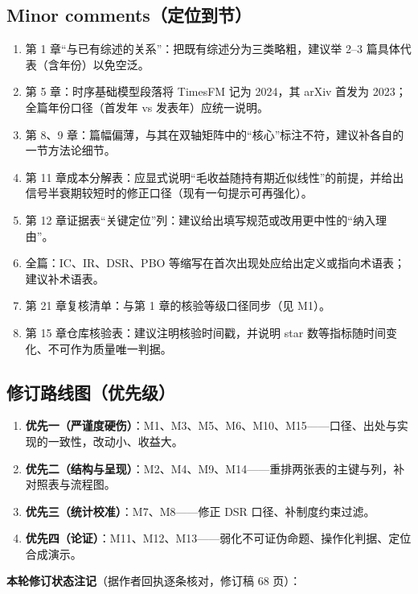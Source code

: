 \documentclass[11pt,a4paper]{ctexart}
\begin{document}
\subsection{Minor comments（定位到节）}

\begin{enumerate}
  \item 第 1 章“与已有综述的关系”：把既有综述分为三类略粗，建议举 2--3 篇具体代表（含年份）以免空泛。
  \item 第 5 章：时序基础模型段落将 TimesFM 记为 2024，其 arXiv 首发为 2023；全篇年份口径（首发年 vs 发表年）应统一说明。
  \item 第 8、9 章：篇幅偏薄，与其在双轴矩阵中的“核心”标注不符，建议补各自的一节方法论细节。
  \item 第 11 章成本分解表：应显式说明“毛收益随持有期近似线性”的前提，并给出信号半衰期较短时的修正口径（现有一句提示可再强化）。
  \item 第 12 章证据表“关键定位”列：建议给出填写规范或改用更中性的“纳入理由”。
  \item 全篇：IC、IR、DSR、PBO 等缩写在首次出现处应给出定义或指向术语表；建议补术语表。
  \item 第 21 章复核清单：与第 1 章的核验等级口径同步（见 M1）。
  \item 第 15 章仓库核验表：建议注明核验时间戳，并说明 star 数等指标随时间变化、不可作为质量唯一判据。
\end{enumerate}

\subsection{修订路线图（优先级）}

\begin{enumerate}
  \item \textbf{优先一（严谨度硬伤）}：M1、M3、M5、M6、M10、M15——口径、出处与实现的一致性，改动小、收益大。
  \item \textbf{优先二（结构与呈现）}：M2、M4、M9、M14——重排两张表的主键与列，补对照表与流程图。
  \item \textbf{优先三（统计校准）}：M7、M8——修正 DSR 口径、补制度约束过滤。
  \item \textbf{优先四（论证）}：M11、M12、M13——弱化不可证伪命题、操作化判据、定位合成演示。
\end{enumerate}

\noindent\textbf{本轮修订状态注记}（据作者回执逐条核对，修订稿 68 页）：
\end{document}
